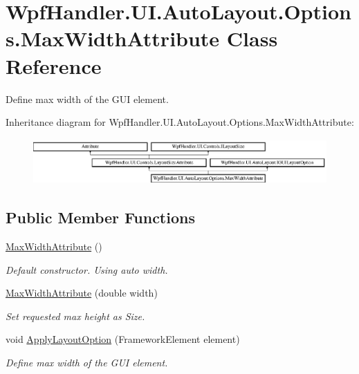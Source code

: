 \hypertarget{class_wpf_handler_1_1_u_i_1_1_auto_layout_1_1_options_1_1_max_width_attribute}{}\section{Wpf\+Handler.\+U\+I.\+Auto\+Layout.\+Options.\+Max\+Width\+Attribute Class Reference}
\label{class_wpf_handler_1_1_u_i_1_1_auto_layout_1_1_options_1_1_max_width_attribute}


Define max width of the G\+UI element.  


Inheritance diagram for Wpf\+Handler.\+U\+I.\+Auto\+Layout.\+Options.\+Max\+Width\+Attribute\+:\begin{figure}[H]
\begin{center}
\leavevmode
\includegraphics[height=1.733746cm]{de/d94/class_wpf_handler_1_1_u_i_1_1_auto_layout_1_1_options_1_1_max_width_attribute}
\end{center}
\end{figure}
\subsection*{Public Member Functions}
\begin{DoxyCompactItemize}
\item 
\mbox{\hyperlink{class_wpf_handler_1_1_u_i_1_1_auto_layout_1_1_options_1_1_max_width_attribute_a3429e7c52bbf6e67c2e712afad4631fe}{Max\+Width\+Attribute}} ()
\begin{DoxyCompactList}\small\item\em Default constructor. Using auto width. \end{DoxyCompactList}\item 
\mbox{\hyperlink{class_wpf_handler_1_1_u_i_1_1_auto_layout_1_1_options_1_1_max_width_attribute_acd322def2c9a5f6cd36b385d1acf2866}{Max\+Width\+Attribute}} (double width)
\begin{DoxyCompactList}\small\item\em Set requested max height as Size. \end{DoxyCompactList}\item 
void \mbox{\hyperlink{class_wpf_handler_1_1_u_i_1_1_auto_layout_1_1_options_1_1_max_width_attribute_ab7c7bf52114b1aa465f70debaeccf5f4}{Apply\+Layout\+Option}} (Framework\+Element element)
\begin{DoxyCompactList}\small\item\em Define max width of the G\+UI element. \end{DoxyCompactList}\end{DoxyCompactItemize}

